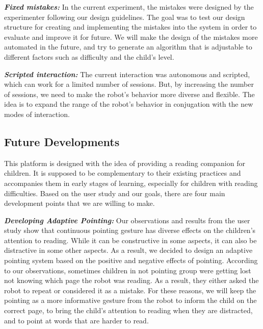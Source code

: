 \documentclass{sigchi}
\begin{document}
\textbf{\textit{Fixed mistakes:}}
In the current experiment, the mistakes were designed by the experimenter following our design guidelines.
The goal was to test our design structure for creating and implementing the mistakes into the system in order to evaluate and improve it for future.
We will make the design of the mistakes more automated in the future, and try to generate an algorithm that is adjustable to different factors such as difficulty and the child's level.


\textbf{\textit{Scripted interaction:}}
The current interaction was autonomous and scripted, which can work for a limited number of sessions.
But, by increasing the number of sessions, we need to make the robot's behavior more diverse and flexible.
The idea is to expand the range of the robot's behavior in conjugation with the new modes of interaction.



\subsection{Future Developments}
This platform is designed with the idea of providing a reading companion for children. 
It is supposed to be complementary to their existing practices and accompanies them in early stages of learning, especially for children with reading difficulties.
Based on the user study and our goals, there are four main development points that we are willing to make.

\textbf{\textit{Developing Adaptive Pointing:}}
Our observations and results from the user study show that continuous pointing gesture has diverse effects on the children's attention to reading.
While it can be constructive in some aspects, it can also be distractive in some other aspects. 
As a result, we decided to design an adaptive pointing system based on the positive and negative effects of pointing.
According to our observations, sometimes children in not pointing group were getting lost not knowing which page the robot was reading.
As a result, they either asked the robot to repeat or considered it as a mistake.
For these reasons, we will keep the pointing as a more informative gesture from the robot to inform the child on the correct page, to bring the child's attention to reading when they are distracted, and to point at words that are harder to read.
\end{document}
